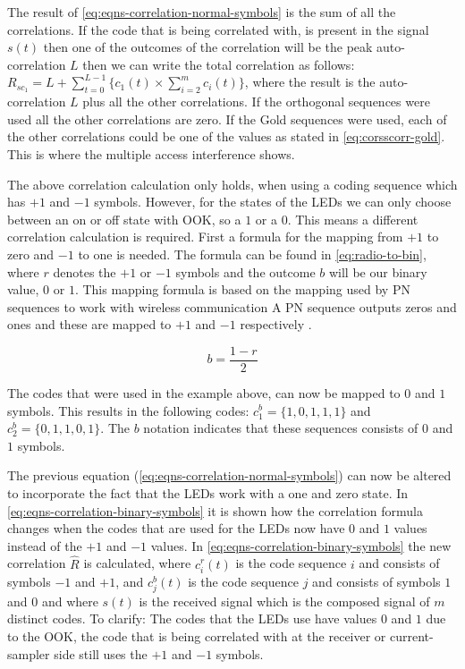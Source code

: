 The result of \autoref{eq:eqns-correlation-normal-symbols} is the sum of all the correlations. 
If the code that is being correlated with, is present in the signal $s(t)$ then one of the outcomes of the correlation will be the peak auto-correlation $L$ then we can write the total correlation as follows: $R_{sc_{1}} = L + \displaystyle\sum_{t = 0} ^ {L - 1} \Bigg\{ c_1(t) \times  \displaystyle\sum_{i = 2} ^ {m} c_i(t) \Bigg\} $, where the result is the auto-correlation $L$ plus all the other correlations.
If the orthogonal sequences were used all the other correlations are zero.
If the Gold sequences were used, each of the other correlations could be one of the values as stated in \autoref{eq:corsscorr-gold}.
This is where the multiple access interference shows.







The above correlation calculation only holds, when using a coding sequence which has $+1$ and $-1$ symbols.
However, for the states of the LEDs we can only choose between an on or off state with OOK, so a $1$ or a $0$.
This means a different correlation calculation is required.
First a formula for the mapping from $+1$ to zero and $-1$ to one is needed.
The formula can be found in \autoref{eq:radio-to-bin}, where $r$ denotes the $+1$ or $-1$ symbols and the outcome $b$ will be our binary value, $0$ or $1$.
This mapping formula is based on the mapping used by PN sequences to work with wireless communication
A PN sequence outputs zeros and ones and these are mapped to $+1$ and $-1$ respectively \cite{cdma-mapping-symbols-ref}.
 
\begin{equation}
	b = \frac{1 - r}{2}
	\label{eq:radio-to-bin}
\end{equation}


The codes that were used in the example above, can now be mapped to $0$ and $1$ symbols.
This results in the following codes: $c^b_1 = \{ 1, 0, 1, 1, 1 \}$ and $c^b_2 = \{ 0, 1, 1, 0, 1 \}$.
The $b$ notation indicates that these sequences consists of $0$ and $1$ symbols.



The previous equation (\autoref{eq:eqns-correlation-normal-symbols}) can now be altered to incorporate the fact that the LEDs work with a one and zero state.
In \autoref{eq:eqns-correlation-binary-symbols} it is shown how the correlation formula changes when the codes that are used for the LEDs now have $0$ and $1$ values instead of the $+1$ and $-1$ values.
In \autoref{eq:eqns-correlation-binary-symbols} the new correlation $\hat{R}$ is calculated, where $c^r_i(t)$ is the code sequence $i$ and consists of symbols $-1$ and $+1$, and $c^b_j(t)$ is the code sequence $j$ and consists of symbols $1$ and $0$ and where $s(t)$ is the received signal which is the composed signal of $m$ distinct codes.
To clarify: The codes that the LEDs use have values $0$ and $1$ due to the OOK, the code that is being correlated with at the receiver or current-sampler side still uses the $+1$ and $-1$ symbols.








